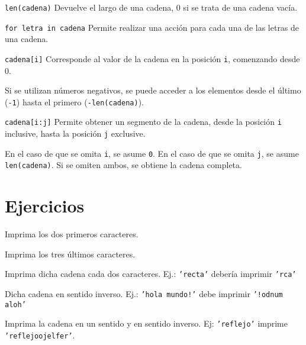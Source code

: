 \begin{referencia_python}

\begin{sintaxis}{\lstinline!len(cadena)!}
Devuelve el largo de una cadena, 0 si se trata de una cadena vacía.
\end{sintaxis}

\begin{sintaxis}{\lstinline!for letra in cadena!}
Permite realizar una acción para cada una de las letras de una cadena.
\end{sintaxis}

\begin{sintaxis}{\lstinline!cadena[i]!}
Corresponde al valor de la cadena en la posición \lstinline!i!, comenzando
desde 0.  

Si se utilizan números negativos, se puede acceder a los
elementos desde el último (\lstinline!-1!) hasta el primero
(\lstinline!-len(cadena)!).
\end{sintaxis}

\begin{sintaxis}{\lstinline!cadena[i:j]!}
Permite obtener un segmento de la cadena, desde la posición \lstinline!i!
inclusive, hasta la posición \lstinline!j! exclusive.

En el caso de que se omita \lstinline!i!, se asume \lstinline!0!.  En el
caso de que se omita \lstinline!j!, se asume \lstinline!len(cadena)!.  Si
se omiten ambos, se obtiene la cadena completa.
\end{sintaxis}

\end{referencia_python}


\newpage
\section{Ejercicios}

\begin{partes}
\item Imprima los dos primeros caracteres.
\item Imprima los tres últimos caracteres.
\item Imprima dicha cadena cada dos caracteres. Ej.: \texttt{'recta'} debería
imprimir \texttt{'rca'}
\item Dicha cadena en sentido inverso. Ej.: \texttt{'hola mundo!'} debe
imprimir \texttt{'!odnum aloh'}
\item Imprima la cadena en un sentido y en sentido inverso. Ej:
\texttt{'reflejo'} imprime \texttt{'reflejoojelfer'}.
\end{partes}



